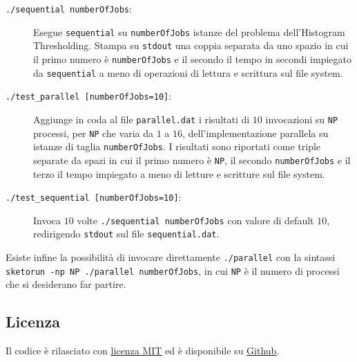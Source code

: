 \documentclass[12pt]{article}
\begin{document}
      \begin{description}
        \item[\texttt{./sequential numberOfJobs}:] Esegue \texttt{sequential}
          su \texttt{numberOfJobs} istanze del problema dell'Histogram
          Thresholding. Stampa su \texttt{stdout} una coppia separata da uno
          spazio in cui il primo numero \`e \texttt{numberOfJobs} e il secondo
          il tempo in secondi impiegato da \texttt{sequential} a meno di
          operazioni di lettura e scrittura sul file system. 
        \item[\texttt{./test\_parallel [numberOfJobs=10]}:] Aggiunge in coda al file
          \texttt{parallel.dat} i risultati di \(10\) invocazioni su \texttt{NP}
          processi, per \texttt{NP} che varia da \(1\) a \(16\),
          dell'implementazione parallela su istanze di taglia
          \texttt{numberOfJobs}. I risultati sono riportati come triple separate
          da spazi in cui il primo numero \`e \texttt{NP}, il secondo
          \texttt{numberOfJobs} e il terzo il tempo impiegato a meno di
          letture e scritture sul file system.
        \item[\texttt{./test\_sequential [numberOfJobs=10]}:] Invoca \(10\)
          volte \texttt{./sequential numberOfJobs} con valore di default \(10\),
          redirigendo \texttt{stdout} sul file \texttt{sequential.dat}.
      \end{description}

      Esiste infine la possibilit\`a di invocare direttamente
      \texttt{./parallel} con la sintassi
      \texttt{sketorun -np NP ./parallel numberOfJobs}, in cui \texttt{NP} \`e
      il numero di processi che si desiderano far partire.

      \subsection{Licenza}

      Il codice \`e rilasciato con \href{http://opensource.org/licenses/MIT}{\underline{licenza MIT}}
      ed \`e disponibile su \href{https://github.com/jacquerie/SPM}{\underline{Github}}.
\end{document}
